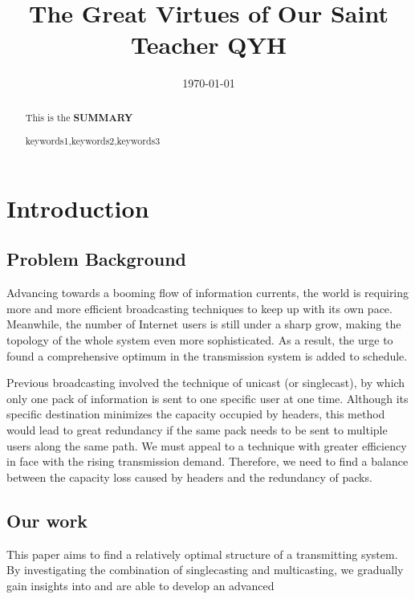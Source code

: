 \documentclass{mcmthesis}
\begin{document}
\linespread{0.6} %
\setlength{\parskip}{0.5\baselineskip} %
\title{The Great Virtues of Our Saint Teacher QYH}

\date{\today}
\begin{abstract}
		 This is the \textbf{SUMMARY}
		 

	\begin{keywords}
	keywords1,keywords2,keywords3
	\end{keywords}
\end{abstract}

\maketitle

\tableofcontents
\newpage

\section{Introduction}

\subsection{Problem Background}

 Advancing towards a booming flow of information currents, the world is requiring more and more efficient broadcasting techniques to keep up with its own pace. Meanwhile, the number of Internet users is still under a sharp grow, making the topology of the whole system even more sophisticated. As a result, the urge to found a comprehensive optimum in the transmission system is added to schedule.
 
 Previous broadcasting involved the technique of unicast (or singlecast), by which only one pack of information is sent to one specific user at one time. Although its specific destination minimizes the capacity occupied by headers, this method would lead to great redundancy if the same pack needs to be sent to multiple users along the same path. We must appeal to a technique with greater efficiency in face with the rising transmission demand. Therefore, we need to find a balance between the capacity loss caused by headers and the redundancy of packs.

\subsection{Our work}
This paper aims to find a relatively optimal structure of a transmitting system. By investigating the combination of singlecasting and multicasting, we gradually gain insights into  and are able to develop an advanced 
\end{document}
